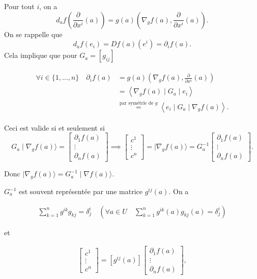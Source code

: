 \documentclass[french]{article}
\theoremstyle{definition}
\begin{document}
Pour tout \(i\), on a \[d_a f\left(\frac{\partial  }{\partial x ^{i}}(a) \right) = g(a) (\nabla _{g}f(a), \frac{\partial  }{\partial x ^{i}}(a)).\] On se rappelle que
\[
d_a f(e_i) = Df(a) (e^i) = \partial_i f(a).
\] Cela implique que pour $G_a = [g _{ij}]$

\begin{gather*}
\begin{aligned}
  \forall i \in \{1, \dots, n \} \quad \partial_i f(a) & = g(a) \left(\nabla_g f(a), \frac{\partial  }{\partial x ^{i}}(a)  \right)  \\ &  = \left\langle  \nabla_g f(a) \mid G_a \mid e_i   \right\rangle \\ &  \stackrel{\text{par sym\'etrie de } g}{=} \left\langle e_i \mid G_a \mid \nabla_g f(a) \right\rangle.
\end{aligned}
\end{gather*}

Ceci est valide si et seulement si \[G_a \mid \nabla _{g}f(a) \rangle  = \left[\begin{matrix}
  \partial_1 f(a) \\
  \vdots \\
  \partial_n f(a)
\end{matrix}\right] \implies \left[\begin{matrix}
  c^1 \\
  \vdots \\
  c^n
\end{matrix}\right] = \mid \nabla_g f(a) \rangle = G_a ^{-1} \left[\begin{matrix}
  \partial_1 f(a) \\
  \vdots \\
  \partial_n f(a)
\end{matrix}\right].\]

Donc \(\mid \nabla _{g}f(a)\rangle = G_a ^{-1} \mid \nabla f(a)\rangle\).

\medskip

\(G_a ^{-1}\) est souvent représentée par une matrice \(g ^{ij}(a)\).  On a

\begin{gather*}
\sum_{k=1}^{n} g ^{ik}g _{kj} = \delta _{j}^{i}  \quad  \left( \forall a \in U \quad \sum_{k=1}^{n} g ^{ik}(a) g _{kj}(a)  = \delta _{j}^{i} \right)
\end{gather*}

et

\begin{gather*}
  \left[\begin{matrix}
    c^1 \\
    \vdots \\
    c^n
  \end{matrix}\right] = [g ^{ij}(a)] \begin{bmatrix}
    \partial_1 f(a) \\
    \vdots \\
    \partial_n f(a)
\end{bmatrix},
\end{gather*}
\end{document}
